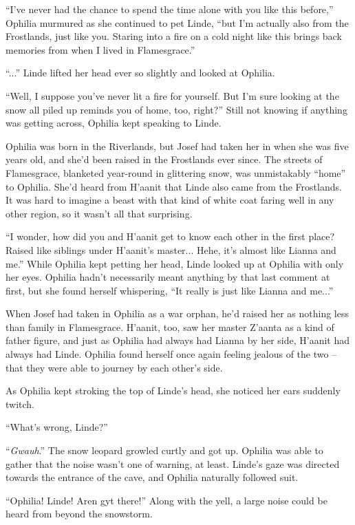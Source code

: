 ``I've never had the chance to spend the time alone with you like this before,'' Ophilia murmured as she continued to pet Linde, ``but I'm actually also from the Frostlands, just like you. Staring into a fire on a cold night like this brings back memories from when I lived in Flamesgrace.''

``...'' Linde lifted her head ever so slightly and looked at Ophilia.

``Well, I suppose you've never lit a fire for yourself. But I'm sure looking at the snow all piled up reminds you of home, too, right?'' Still not knowing if anything was getting across, Ophilia kept speaking to Linde.

Ophilia was born in the Riverlands, but Josef had taken her in when she was five years old, and she'd been raised in the Frostlands ever since. The streets of Flamesgrace, blanketed year-round in glittering snow, was unmistakably ``home'' to Ophilia. She'd heard from H'aanit that Linde also came from the Frostlands. It was hard to imagine a beast with that kind of white coat faring well in any other region, so it wasn't all that surprising.

``I wonder, how did you and H'aanit get to know each other in the first place? Raised like siblings under H'aanit's master... Hehe, it's almost like Lianna and me.'' While Ophilia kept petting her head, Linde looked up at Ophilia with only her eyes. Ophilia hadn't necessarily meant anything by that last comment at first, but she found herself whispering, ``It really is just like Lianna and me...''

When Josef had taken in Ophilia as a war orphan, he'd raised her as nothing less than family in Flamesgrace. H'aanit, too, saw her master Z'aanta as a kind of father figure, and just as Ophilia had always had Lianna by her side, H'aanit had always had Linde. Ophilia found herself once again feeling jealous of the two -- that they were able to journey by each other's side.

As Ophilia kept stroking the top of Linde's head, she noticed her ears suddenly twitch. 

``What's wrong, Linde?''

``\emph{Gwauh}.'' The snow leopard growled curtly and got up. Ophilia was able to gather that the noise wasn't one of warning, at least. Linde's gaze was directed towards the entrance of the cave, and Ophilia naturally followed suit.

``Ophilia! Linde! Aren gyt there!'' Along with the yell, a large noise could be heard from beyond the snowstorm.

